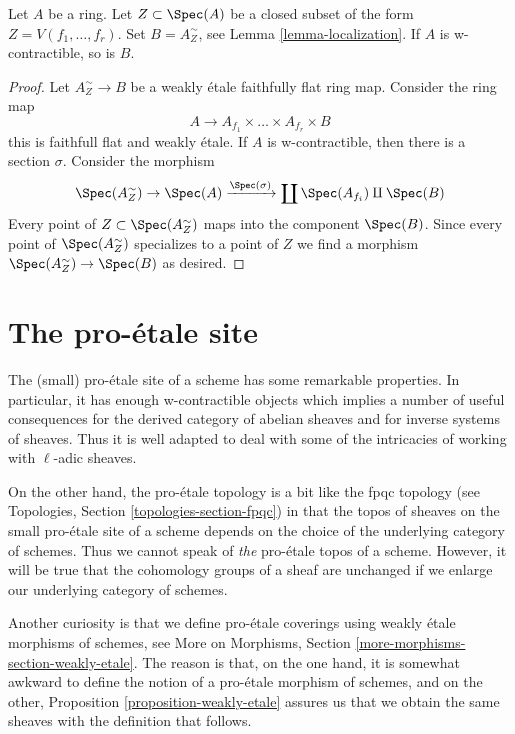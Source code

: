 \begin{lemma}
\label{lemma-localization-w-contractible}
Let $A$ be a ring. Let $Z \subset \Spec(A)$ be a closed subset
of the form $Z = V(f_1, \ldots, f_r)$. Set $B = A_Z^\sim$, see
Lemma \ref{lemma-localization}. If $A$ is w-contractible, so is $B$.
\end{lemma}

\begin{proof}
Let $A_Z^\sim \to B$ be a weakly \'etale faithfully flat ring map.
Consider the ring map
$$
A \longrightarrow A_{f_1} \times \ldots \times A_{f_r} \times B
$$
this is faithfull flat and weakly \'etale. If $A$ is w-contractible,
then there is a section $\sigma$. Consider the morphism
$$
\Spec(A_Z^\sim) \to \Spec(A) \xrightarrow{\Spec(\sigma)}
\coprod \Spec(A_{f_i}) \amalg \Spec(B)
$$
Every point of $Z \subset \Spec(A_Z^\sim)$ maps into the component
$\Spec(B)$. Since every point of $\Spec(A_Z^\sim)$ specializes to a
point of $Z$ we find a morphism $\Spec(A_Z^\sim) \to \Spec(B)$
as desired.
\end{proof}






\section{The pro-\'etale site}
\label{section-proetale}

\noindent
The (small) pro-\'etale site of a scheme has some remarkable properties.
In particular, it has enough w-contractible objects which implies
a number of useful consequences for the derived category
of abelian sheaves and for inverse systems of sheaves. Thus it is
well adapted to deal with some of the intricacies of working
with $\ell$-adic sheaves.

\medskip\noindent
On the other hand, the pro-\'etale topology is a bit like
the fpqc topology (see Topologies, Section \ref{topologies-section-fpqc})
in that the topos of sheaves on the small pro-\'etale site of a scheme
depends on the choice of the underlying category of schemes. Thus we cannot
speak of {\it the} pro-\'etale topos of a scheme. However, it will be
true that the cohomology groups of a sheaf are unchanged if we enlarge
our underlying category of schemes.

\medskip\noindent
Another curiosity is that we define pro-\'etale coverings using weakly
\'etale morphisms of schemes, see
More on Morphisms, Section \ref{more-morphisms-section-weakly-etale}.
The reason is that, on the one hand, it is somewhat awkward to define
the notion of a pro-\'etale morphism of schemes, and on the other,
Proposition \ref{proposition-weakly-etale}
assures us that we obtain the same sheaves with the
definition that follows.

